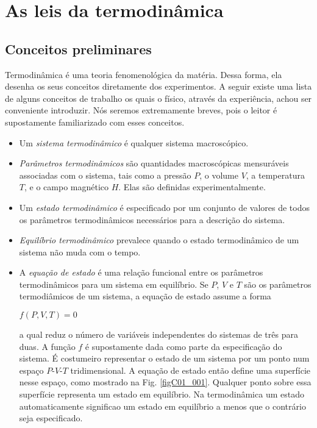 \chapter{As leis da termodin\^amica}
\noindent

\section{Conceitos preliminares}
\noindent
Termodin\^amica \'e uma teoria fenomenol\'ogica da mat\'eria. Dessa forma, ela desenha os seus conceitos diretamente dos experimentos. A seguir existe uma lista de alguns conceitos de trabalho os quais o f\'isico, atrav\'es da experi\^encia, achou ser conveniente introduzir. N\'os seremos extremamente breves, pois o leitor \'e supostamente familiarizado com esses conceitos.
\begin{itemize}
\item[(a)] Um {\it sistema termodin\^amico} \'e qualquer sistema macrosc\'opico.
\item[(b)] {\it Par\^ametros termodin\^amicos} s\~ao quantidades macrosc\'opicas mensur\'aveis associadas com o sistema, tais como a press\~ao $P$, o volume $V$, a temperatura $T$, e o campo magn\'etico $H$. Elas s\~ao definidas experimentalmente.
\item[(c)] Um {\it estado termodin\^amico} \'e especificado por um conjunto de valores de todos os par\^ametros termodin\^amicos necess\'arios para a descri\c{c}\~ao do sistema.
\item[(d)] {\it Equil\'ibrio termodin\^amico} prevalece quando o estado termodin\^amico de um sistema n\~ao muda com o tempo.
\item[(e)] A {\it equa\c{c}\~ao de estado} \'e uma rela\c{c}\~ao funcional entre os par\^ametros termodin\^amicos para um sistema em equil\'ibrio. Se $P$, $V$ e $T$ s\~ao os par\^ametros termodi\^amicos de um sistema, a equa\c{c}\~ao de estado assume a forma
\begin{center}
$f(P,V,T)=0$
\end{center}
a qual reduz o n\'umero de vari\'aveis independentes do sistemas de tr\^es para duas. A fun\c{c}\~ao $f$ \'e supostamente dada como parte da especifica\c{c}\~ao do sistema. \'E costumeiro representar o estado de um sistema por um ponto num espa\c{c}o $P$-$V$-$T$ tridimensional. A equa\c{c}\~ao de estado ent\~ao define uma superf\'icie nesse espa\c{c}o, como mostrado na Fig. \ref{figC01_001}. Qualquer ponto sobre essa superf\'icie representa um estado em equil\'ibrio. Na termodin\^amica um estado automaticamente significao um estado em equil\'ibrio a menos que o contr\'ario seja especificado.

\end{itemize}
